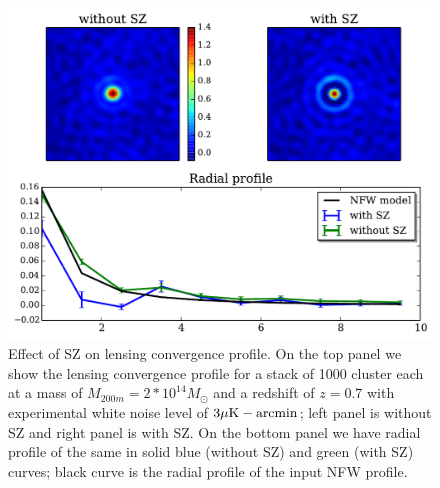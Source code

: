  \begin{figure}[ht]
\includegraphics[width=\linewidth]{figs/tSZ_effect_on_lensing.pdf}
\caption{Effect of SZ on lensing convergence profile. On the top panel we show the lensing convergence profile for a stack of 1000 cluster each at a mass of $M_{200m}= 2*10^{14}  M_{\odot}$ and a redshift of $z = 0.7$ with experimental white noise level of $3\mu{\rm K-arcmin}$; left panel is without SZ and right panel is with SZ. On the bottom panel we have radial profile of the same in solid blue (without SZ) and green (with SZ) curves; black curve is the radial profile of the input NFW profile. }
\label{fig:SZ_effect}
\end{figure}
